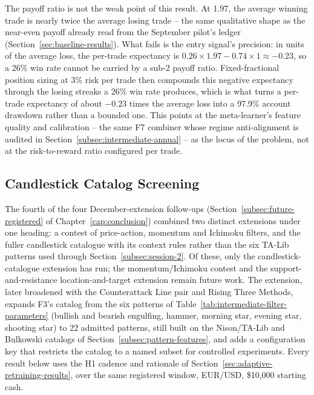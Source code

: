 The payoff ratio is not the weak point of this result. At 1.97, the average winning trade is nearly twice the average losing trade -- the same qualitative shape as the near-even payoff already read from the September pilot's ledger (Section~\ref{sec:baseline-results}). What fails is the entry signal's precision: in units of the average loss, the per-trade expectancy is $0.26 \times 1.97 - 0.74 \times 1 \approx -0.23$, so a 26\% win rate cannot be carried by a sub-2 payoff ratio. Fixed-fractional position sizing at 3\% risk per trade then compounds this negative expectancy through the losing streaks a 26\% win rate produces, which is what turns a per-trade expectancy of about $-0.23$ times the average loss into a 97.9\% account drawdown rather than a bounded one. This points at the meta-learner's feature quality and calibration -- the same F7 combiner whose regime anti-alignment is audited in Section~\ref{subsec:intermediate-annual} -- as the locus of the problem, not at the risk-to-reward ratio configured per trade.

\subsection{Candlestick Catalog Screening} \label{sec:candlestick-screening}

The fourth of the four December-extension follow-ups (Section~\ref{subsec:future-registered} of Chapter~\ref{cap:conclusion}) combined two distinct extensions under one heading: a contest of price-action, momentum and Ichimoku filters, and the fuller candlestick catalogue with its context rules rather than the six TA-Lib patterns used through Section~\ref{subsec:session-2}. Of these, only the candlestick-catalogue extension has run; the momentum/Ichimoku contest and the support-and-resistance location-and-target extension remain future work. The extension, later broadened with the Counterattack Line pair and Rising Three Methods, expands F3's catalog from the six patterns of Table~\ref{tab:intermediate-filter-parameters} (bullish and bearish engulfing, hammer, morning star, evening star, shooting star) to 22 admitted patterns, still built on the Nison/TA-Lib and Bulkowski catalogs of Section~\ref{subsec:pattern-features}, and adds a  configuration key that restricts the catalog to a named subset for controlled experiments. Every result below uses the H1 cadence and rationale of Section~\ref{sec:adaptive-retraining-results}, over the same registered window, EUR/USD, \$10,000 starting cash.

